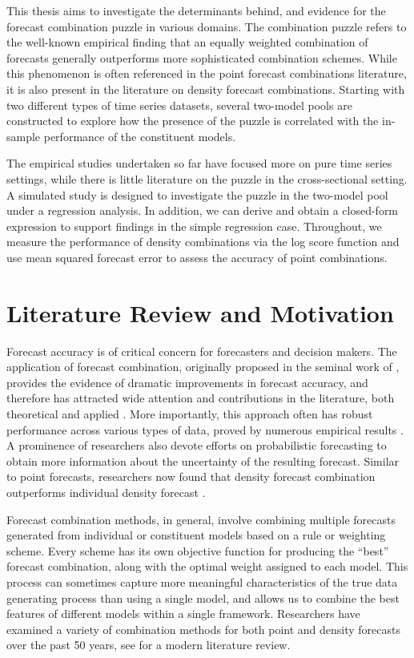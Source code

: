 \documentclass{monashthesis}
\begin{document}
This thesis aims to investigate the determinants behind, and evidence for the forecast combination puzzle in various domains. The combination puzzle refers to the well-known empirical finding that an equally weighted combination of forecasts generally outperforms more sophisticated combination schemes. While this phenomenon is often referenced in the point forecast combinations literature, it is also present in the literature on density forecast combinations. Starting with two different types of time series datasets, several two-model pools are constructed to explore how the presence of the puzzle is correlated with the in-sample performance of the constituent models.

The empirical studies undertaken so far have focused more on pure time series settings, while there is little literature on the puzzle in the cross-sectional setting. A simulated study is designed to investigate the puzzle in the two-model pool under a regression analysis. In addition, we can derive and obtain a closed-form expression to support findings in the simple regression case. Throughout, we measure the performance of density combinations via the log score function and use mean squared forecast error to assess the accuracy of point combinations.

\hypertarget{literature-review-and-motivation}{%
\section{Literature Review and Motivation}\label{literature-review-and-motivation}}

Forecast accuracy is of critical concern for forecasters and decision makers. The application of forecast combination, originally proposed in the seminal work of \textcite{BG69}, provides the evidence of dramatic improvements in forecast accuracy, and therefore has attracted wide attention and contributions in the literature, both theoretical and applied \autocite{C89,T06}. More importantly, this approach often has robust performance across various types of data, proved by numerous empirical results \autocite{GA11}. A prominence of researchers also devote efforts on probabilistic forecasting to obtain more information about the uncertainty of the resulting forecast. Similar to point forecasts, researchers now found that density forecast combination outperforms individual density forecast \autocites[e.g.,][]{HM07,GA11}.

Forecast combination methods, in general, involve combining multiple forecasts generated from individual or constituent models based on a rule or weighting scheme. Every scheme has its own objective function for producing the ``best'' forecast combination, along with the optimal weight assigned to each model. This process can sometimes capture more meaningful characteristics of the true data generating process than using a single model, and allows us to combine the best features of different models within a single framework. Researchers have examined a variety of combination methods for both point and density forecasts over the past 50 years, see \textcite{WHLK22} for a modern literature review.
\end{document}
